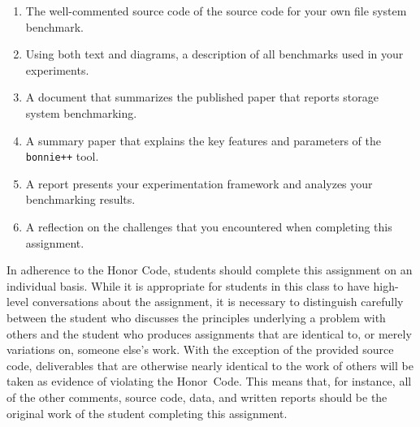 \vspace*{-.1in}

\begin{enumerate}
  \itemsep 0em

  \item The well-commented source code of the source code for your own file system benchmark.

  \item Using both text and diagrams, a description of all benchmarks used in your experiments.

  \item A document that summarizes the published paper that reports storage system benchmarking.

  \item A summary paper that explains the key features and parameters of the {\tt bonnie++} tool.

  \item A report presents your experimentation framework and analyzes your benchmarking results.

  \item A reflection on the challenges that you encountered when completing this assignment.

\end{enumerate}

\vspace*{-.1in}


In adherence to the Honor Code, students should complete this assignment on an individual basis. While it is appropriate
for students in this class to have high-level conversations about the assignment, it is necessary to distinguish
carefully between the student who discusses the principles underlying a problem with others and the student who produces
assignments that are identical to, or merely variations on, someone else's work.  With the exception of the provided
source code, deliverables that are otherwise nearly identical to the work of others will be taken as evidence of
violating the \mbox{Honor Code}. This means that, for instance, all of the other comments, source code, data, and
written reports should be the original work of the student completing this assignment.



